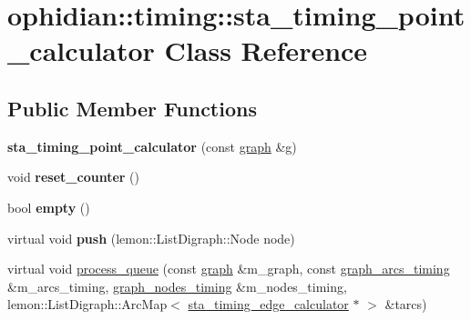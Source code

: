 \hypertarget{classophidian_1_1timing_1_1sta__timing__point__calculator}{\section{ophidian\-:\-:timing\-:\-:sta\-\_\-timing\-\_\-point\-\_\-calculator Class Reference}
\label{classophidian_1_1timing_1_1sta__timing__point__calculator}
}
\subsection*{Public Member Functions}
\begin{DoxyCompactItemize}
\item 
\hypertarget{classophidian_1_1timing_1_1sta__timing__point__calculator_a66fdb10df8fd86b47f30564aba9427bb}{{\bfseries sta\-\_\-timing\-\_\-point\-\_\-calculator} (const \hyperlink{classophidian_1_1timing_1_1graph}{graph} \&g)}\label{classophidian_1_1timing_1_1sta__timing__point__calculator_a66fdb10df8fd86b47f30564aba9427bb}

\item 
\hypertarget{classophidian_1_1timing_1_1sta__timing__point__calculator_a48d5fe5559e3c2deef2a0172b0300448}{void {\bfseries reset\-\_\-counter} ()}\label{classophidian_1_1timing_1_1sta__timing__point__calculator_a48d5fe5559e3c2deef2a0172b0300448}

\item 
\hypertarget{classophidian_1_1timing_1_1sta__timing__point__calculator_a538cc055479c5e5fa73b2f41f3536558}{bool {\bfseries empty} ()}\label{classophidian_1_1timing_1_1sta__timing__point__calculator_a538cc055479c5e5fa73b2f41f3536558}

\item 
\hypertarget{classophidian_1_1timing_1_1sta__timing__point__calculator_a7d92d877d754d774025d5e2acc641318}{virtual void {\bfseries push} (lemon\-::\-List\-Digraph\-::\-Node node)}\label{classophidian_1_1timing_1_1sta__timing__point__calculator_a7d92d877d754d774025d5e2acc641318}

\item 
virtual void \hyperlink{classophidian_1_1timing_1_1sta__timing__point__calculator_ab02dcda032d2166dcf47f36e3554fd08}{process\-\_\-queue} (const \hyperlink{classophidian_1_1timing_1_1graph}{graph} \&m\-\_\-graph, const \hyperlink{classophidian_1_1timing_1_1graph__arcs__timing}{graph\-\_\-arcs\-\_\-timing} \&m\-\_\-arcs\-\_\-timing, \hyperlink{classophidian_1_1timing_1_1graph__nodes__timing}{graph\-\_\-nodes\-\_\-timing} \&m\-\_\-nodes\-\_\-timing, lemon\-::\-List\-Digraph\-::\-Arc\-Map$<$ \hyperlink{classophidian_1_1timing_1_1sta__timing__edge__calculator}{sta\-\_\-timing\-\_\-edge\-\_\-calculator} $\ast$ $>$ \&tarcs)
\end{DoxyCompactItemize}


